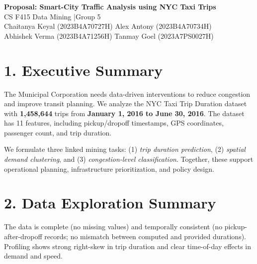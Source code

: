 \documentclass[11pt]{article}
\begin{document}
\begin{center}
    {\Large \textbf{Proposal: Smart-City Traffic Analysis using NYC Taxi Trips}}\\[5pt]
    {\normalsize CS F415 Data Mining \quad|\quad Group 5}\\[2pt]
    {\small
    Chaitanya Keyal (2023B4A70727H) \quad
    Alex Antony (2023B4A70734H)\\
    Abhishek Verma (2023B4A71256H) \quad
    Tanmay Goel (2023A7PS0027H)
    }
\end{center}

\section*{1. Executive Summary}
The Municipal Corporation needs data-driven interventions to reduce congestion and improve transit planning. We analyze the NYC Taxi Trip Duration dataset with \textbf{1,458,644} trips from \textbf{January 1, 2016 to June 30, 2016}. The dataset has 11 features, including pickup/dropoff timestamps, GPS coordinates, passenger count, and trip duration.

We formulate three linked mining tasks: (1) \textit{trip duration prediction}, (2) \textit{spatial demand clustering}, and (3) \textit{congestion-level classification}. Together, these support operational planning, infrastructure prioritization, and policy design.

\section*{2. Data Exploration Summary}
The data is complete (no missing values) and temporally consistent (no pickup-after-dropoff records; no mismatch between computed and provided durations). Profiling shows strong right-skew in trip duration and clear time-of-day effects in demand and speed.
\end{document}

